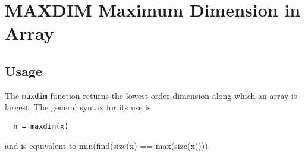 \section{MAXDIM Maximum Dimension in Array}

\subsection{Usage}

The \verb|maxdim| function returns the lowest order dimension
along which an array is largest.  The general syntax for its
use is
\begin{verbatim}
  n = maxdim(x)
\end{verbatim}
and is equivalent to min(find(size(x) == max(size(x)))).
